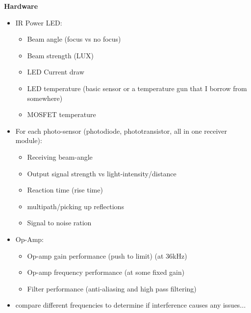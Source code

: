 \textbf{Hardware}
\begin{itemize}
	\item IR Power LED:
	\begin{itemize}
		\item Beam angle (focus vs no focus)
		\item Beam strength (LUX)
		\item LED Current draw
		\item LED temperature (basic sensor or a temperature gun that I borrow from somewhere)
		\item MOSFET temperature
	\end{itemize}
	\item For each photo-sensor (photodiode, phototransistor, all in one receiver module):
	\begin{itemize}
		\item Receiving beam-angle
		\item Output signal strength vs light-intensity/distance
		\item Reaction time (rise time)
		\item multipath/picking up reflections
		\item Signal to noise ration
	\end{itemize}
	\item Op-Amp:
	\begin{itemize}
		\item Op-amp gain performance (push to limit) (at 36kHz)
		\item Op-amp frequency performance (at some fixed gain)
		\item Filter performance (anti-aliasing and high pass filtering)
	\end{itemize}

	\item compare different frequencies to determine if interference causes any issues...
\end{itemize}

